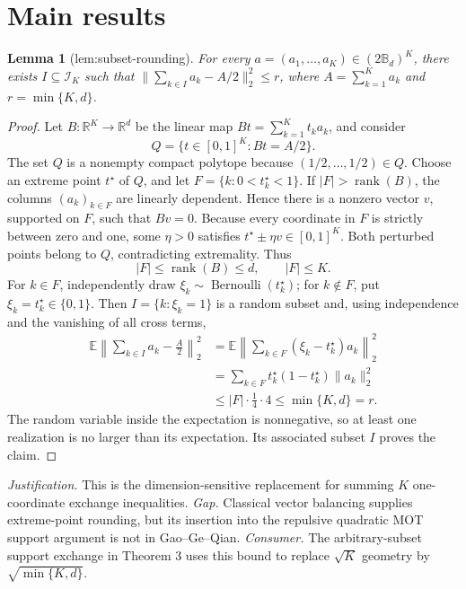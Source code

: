 \documentclass{article}
\newtheorem{lemma}{Lemma}
\begin{document}
\section{Main results}

\begin{lemma}[lem:subset-rounding]\label{lem:subset-rounding}
For every \(a=(a_1,\ldots,a_K)\in(2\mathbb B_d)^K\), there exists \(I\subseteq\mathcal I_K\) such that \(\|\sum_{k\in I}a_k-A/2\|_2^2\le r\), where \(A=\sum_{k=1}^Ka_k\) and \(r=\min\{K,d\}\).
\end{lemma}
\begin{proof}
Let \(B:\mathbb R^K\to\mathbb R^d\) be the linear map \(Bt=\sum_{k=1}^Kt_ka_k\), and consider
\[
Q=\{t\in[0,1]^K:Bt=A/2\}.
\]
The set \(Q\) is a nonempty compact polytope because \((1/2,\ldots,1/2)\in Q\). Choose an extreme point \(t^\star\) of \(Q\), and let \(F=\{k:0<t_k^\star<1\}\). If \(|F|>\operatorname{rank}(B)\), the columns \((a_k)_{k\in F}\) are linearly dependent. Hence there is a nonzero vector \(v\), supported on \(F\), such that \(Bv=0\). Because every coordinate in \(F\) is strictly between zero and one, some \(\eta>0\) satisfies \(t^\star\pm\eta v\in[0,1]^K\). Both perturbed points belong to \(Q\), contradicting extremality. Thus
\[
|F|\le \operatorname{rank}(B)\le d,\qquad |F|\le K.
\]
For \(k\in F\), independently draw \(\xi_k\sim\operatorname{Bernoulli}(t_k^\star)\); for \(k\notin F\), put \(\xi_k=t_k^\star\in\{0,1\}\). Then \(I=\{k:\xi_k=1\}\) is a random subset and, using independence and the vanishing of all cross terms,
\[
\begin{aligned}
\mathbb E\left\|\sum_{k\in I}a_k-\frac A2\right\|_2^2
&=\mathbb E\left\|\sum_{k\in F}(\xi_k-t_k^\star)a_k\right\|_2^2\\
&=\sum_{k\in F}t_k^\star(1-t_k^\star)\|a_k\|_2^2\\
&\le |F|\cdot\frac14\cdot4
\le\min\{K,d\}=r.
\end{aligned}
\]
The random variable inside the expectation is nonnegative, so at least one realization is no larger than its expectation. Its associated subset \(I\) proves the claim.
\end{proof}
\par\smallskip\noindent \textit{Justification.} This is the dimension-sensitive replacement for summing \(K\) one-coordinate exchange inequalities. \textit{Gap.} Classical vector balancing supplies extreme-point rounding, but its insertion into the repulsive quadratic MOT support argument is not in Gao--Ge--Qian. \textit{Consumer.} The arbitrary-subset support exchange in Theorem 3 uses this bound to replace \(\sqrt K\) geometry by \(\sqrt{\min\{K,d\}}\).
\end{document}
